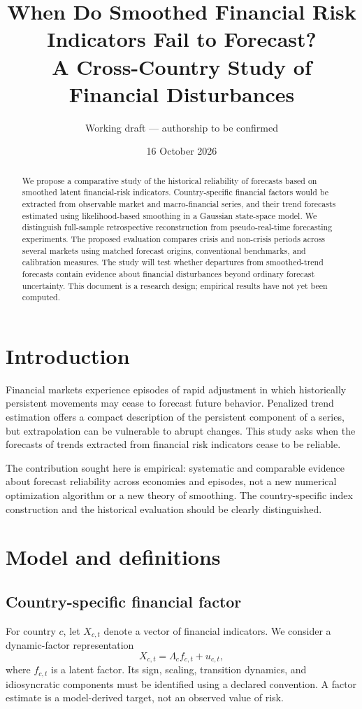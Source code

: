 \documentclass[11pt]{article}
\title{When Do Smoothed Financial Risk Indicators Fail to Forecast?\\
A Cross-Country Study of Financial Disturbances}
\author{Working draft --- authorship to be confirmed}
\date{16 October 2026}
\begin{document}
\maketitle
\begin{abstract}
We propose a comparative study of the historical reliability of forecasts
based on smoothed latent financial-risk indicators. Country-specific financial
factors would be extracted from observable market and macro-financial series,
and their trend forecasts estimated using likelihood-based smoothing in a
Gaussian state-space model. We distinguish full-sample retrospective
reconstruction from pseudo-real-time forecasting experiments. The proposed
evaluation compares crisis and non-crisis periods across several markets
using matched forecast origins, conventional benchmarks, and calibration
measures. The study will test whether departures from smoothed-trend
forecasts contain evidence about financial disturbances beyond ordinary
forecast uncertainty. This document is a research design; empirical results
have not yet been computed.
\end{abstract}

\section{Introduction}
Financial markets experience episodes of rapid adjustment in which
historically persistent movements may cease to forecast future behavior.
Penalized trend estimation offers a compact description of the persistent
component of a series, but extrapolation can be vulnerable to abrupt changes.
This study asks when the forecasts of trends extracted from financial
risk indicators cease to be reliable.

The contribution sought here is empirical: systematic and comparable
evidence about forecast reliability across economies and episodes, not a
new numerical optimization algorithm or a new theory of smoothing.
The country-specific index construction and the historical evaluation
should be clearly distinguished.

\section{Model and definitions}
\subsection{Country-specific financial factor}
For country $c$, let $X_{c,t}$ denote a vector of financial indicators.
We consider a dynamic-factor representation
\begin{equation}
X_{c,t}=\Lambda_c f_{c,t}+u_{c,t},
\end{equation}
where $f_{c,t}$ is a latent factor. Its sign, scaling, transition dynamics,
and idiosyncratic components must be identified using a declared convention.
A factor estimate is a model-derived target, not an observed value of risk.
\end{document}
